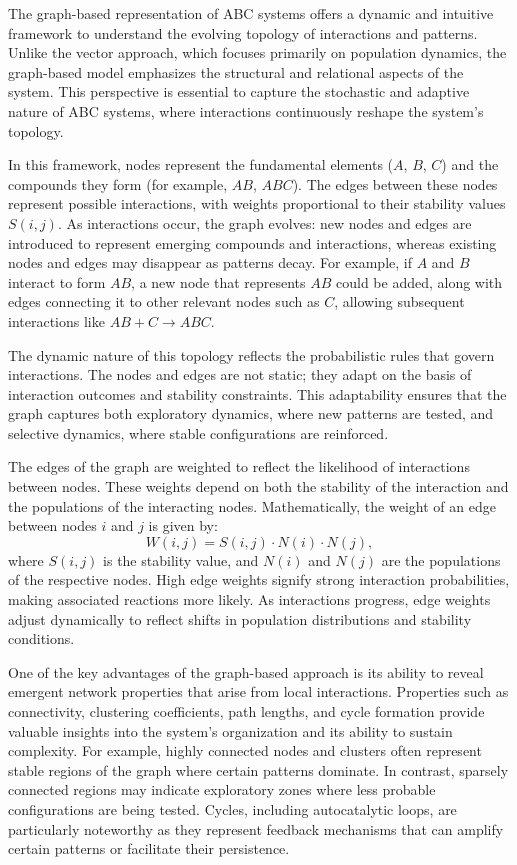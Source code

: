 \documentclass[%
 preprint, linenumbers,
 amsmath,amssymb,
 aps, physrev,
]{revtex4-2}
\begin{document}
The graph-based representation of ABC systems offers a dynamic and intuitive framework to understand the evolving topology of interactions and patterns. Unlike the vector approach, which focuses primarily on population dynamics, the graph-based model emphasizes the structural and relational aspects of the system. This perspective is essential to capture the stochastic and adaptive nature of ABC systems, where interactions continuously reshape the system's topology.

In this framework, nodes represent the fundamental elements ($A$, $B$, $C$) and the compounds they form (for example, $AB$, $ABC$). The edges between these nodes represent possible interactions, with weights proportional to their stability values $S(i, j)$. As interactions occur, the graph evolves: new nodes and edges are introduced to represent emerging compounds and interactions, whereas existing nodes and edges may disappear as patterns decay. For example, if $A$ and $B$ interact to form $AB$, a new node that represents $AB$ could be added, along with edges connecting it to other relevant nodes such as $C$, allowing subsequent interactions like $AB + C \to ABC$.

The dynamic nature of this topology reflects the probabilistic rules that govern interactions. The nodes and edges are not static; they adapt on the basis of interaction outcomes and stability constraints. This adaptability ensures that the graph captures both exploratory dynamics, where new patterns are tested, and selective dynamics, where stable configurations are reinforced.

The edges of the graph are weighted to reflect the likelihood of interactions between nodes. These weights depend on both the stability of the interaction and the populations of the interacting nodes. Mathematically, the weight of an edge between nodes $i$ and $j$ is given by:
\begin{equation}
W(i, j) = S(i, j) \cdot N(i) \cdot N(j),
\end{equation}
where $S(i, j)$ is the stability value, and $N(i)$ and $N(j)$ are the populations of the respective nodes. High edge weights signify strong interaction probabilities, making associated reactions more likely. As interactions progress, edge weights adjust dynamically to reflect shifts in population distributions and stability conditions.

One of the key advantages of the graph-based approach is its ability to reveal emergent network properties that arise from local interactions. Properties such as connectivity, clustering coefficients, path lengths, and cycle formation provide valuable insights into the system’s organization and its ability to sustain complexity. For example, highly connected nodes and clusters often represent stable regions of the graph where certain patterns dominate. In contrast, sparsely connected regions may indicate exploratory zones where less probable configurations are being tested. Cycles, including autocatalytic loops, are particularly noteworthy as they represent feedback mechanisms that can amplify certain patterns or facilitate their persistence.
\end{document}
